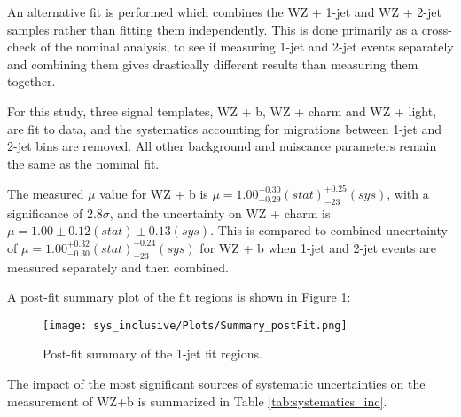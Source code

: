 
An alternative fit is performed which combines the WZ + 1-jet and WZ + 2-jet samples rather than fitting them independently. This is done primarily as a cross-check of the nominal analysis, to see if measuring 1-jet and 2-jet events separately and combining them gives drastically different results than measuring them together. 

For this study, three signal templates, WZ + b, WZ + charm and WZ + light, are fit to data, and the systematics accounting for migrations between 1-jet and 2-jet bins are removed. All other background and nuiscance parameters remain the same as the nominal fit. 

The measured $\mu$ value for WZ + b is  $\mu = 1.00^{+0.30}_{-0.29}(stat)^{+0.25}_{-23}(sys)$, with a significance of 2.8$\sigma$, and the uncertainty on WZ + charm is $\mu = 1.00\pm 0.12 (stat)\pm 0.13 (sys)$. This is compared to combined uncertainty of $\mu = 1.00^{+0.32}_{-0.30}(stat)^{+0.24}_{-23}(sys)$ for WZ + b when 1-jet and 2-jet events are measured separately and then combined.

A post-fit summary plot of the fit regions is shown in Figure \ref{fig:fit_results_inc}: 

\begin{figure}[H]
    \center
    \texttt{[image: sys\_inclusive/Plots/Summary\_postFit.png]}
    \caption{Post-fit summary of the 1-jet fit regions.}
    \label{fig:fit_results_inc}
\end{figure}

The impact of the most significant sources of systematic uncertainties on the measurement of WZ+b is summarized in Table \ref{tab:systematics_inc}. 

